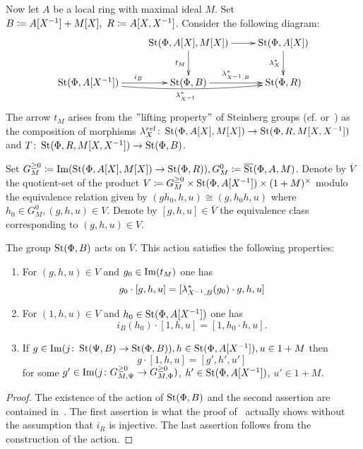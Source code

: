Now let $A$ be a local ring with maximal ideal $M$.
Set $B \coloneqq A[X^{-1}] + M[X],\ R \coloneqq A[X, X^{-1}]$.
Consider the following diagram:
\[ \xymatrix{ & \St(\Phi, A[X], M[X]) \ar[d]_{t_M} \ar[r] & \St(\Phi, A[X]) \ar[d]_{\lambda_X^*} \\
   \St(\Phi, A[X\inv]) \ar[r]^{i_B} \ar@/_/[rr]_{\lambda_{X\inv}^*} & \St(\Phi, B) \ar[r]^{\lambda^*_{X\inv, B}} & \St(\Phi, R)
}\]
The arrow $t_M$ arises from the \("\)lifting property\("\) of Steinberg groups (cf. \cite[Lemma~3.3]{LS20} or~\cite[Theorem~3]{LS17}) as the composition of morphisms
$\lambda_{X}^{rel}\colon \operatorname{St}(\Phi, A[X], M[X]) \to \operatorname{St}(\Phi, R, M[X, X^{-1}])$ and $T \colon \operatorname{St}(\Phi, R, M[X, X^{-1}]) \to \operatorname{St}(\Phi, B)$.

Set $G_M^{\geq 0} \coloneqq \operatorname{Im}(\operatorname{St}(\Phi, A[X], M[X]) \to \operatorname{St}(\Phi, R)), G_M^0 \coloneqq \overline{\operatorname{St}}(\Phi, A, M)$.%
Denote by $\overline{V}$ the quotient-set of the product $V \coloneqq G_M^{\geq 0} \times \operatorname{St}(\Phi, A[X^{-1}]) \times (1 + M)^\times$
 modulo the equivalence relation given by $(gh_0, h, u) \cong (g, h_0h, u)$ where $h_0 \in G_M^0, (g, h, u) \in V.$
Denote by $[g, h, u] \in \overline{V}$ the equivalence class corresponding to $(g, h, u)\in V$.

\begin{prop} \label{prop:horrocks-main} The group $\operatorname{St}(\Phi, B)$ acts on $\overline{V}$.
 This action satisfies the following properties:
    \begin{enumerate}
        \item For $(g, h, u) \in V$ and $g_0 \in \operatorname{Im}(t_M)$ one has
         \[g_0 \cdot [g, h, u] = [\lambda_{X^{-1}, B}^* (g_0) \cdot g, h, u]\]
        \item For $(1, h, u) \in V$ and $h_0 \in \operatorname{St}(\Phi, A[X^{-1}])$ one has
         \[ i_B(h_0) \cdot [1, h, u] = [1, h_0 \cdot h, u].\]
        \item If $g \in \operatorname{Im}(j\colon \operatorname{St}(\Psi, B) \to \operatorname{St}(\Phi, B)), h \in \operatorname{St}(\Phi, A[X^{-1}]), u \in 1 + M$ then
         \[ g \cdot [1, h, u] = [g', h', u']\] for some $g' \in \operatorname{Im}(j\colon G_{M, \Psi}^{\geq 0} \to G_{M, \Phi}^{\geq 0})$, $h' \in \operatorname{St}(\Phi, A[X^{-1}])$, $u'\in 1 + M$.
    \end{enumerate}
\end{prop}
\begin{proof}
    The existence of the action of $\operatorname{St}(\Phi, B)$ and the second assertion are contained in~\cite[Proposition~5.39]{LS20}.
    The first assertion is what the proof of~\cite[Lemma~5.41]{LS20} actually shows without the assumption that $i_R$ is injective.
    The last assertion follows from the construction of the action. %
\end{proof}

